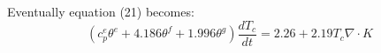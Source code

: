 Eventually equation (21) becomes:
\begin{equation}
(c_p^e \theta^e + 4.186 \theta^f + 1.996 \theta^g) \frac{dT_c}{dt} = 2.26 + 2.19 T_c \nabla \cdot K
\end{equation}